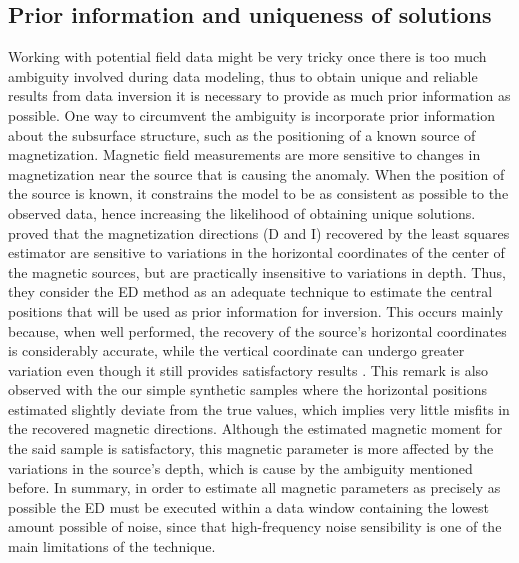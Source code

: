 \subsection{Prior information and uniqueness of solutions}
Working with potential field data might be very tricky once there is too much ambiguity involved during data modeling, thus to obtain unique and reliable results from data inversion it is necessary to provide as much prior information as possible. One way to circumvent the ambiguity is incorporate prior information about the subsurface structure, such as the positioning of a known source of magnetization. Magnetic field measurements are more sensitive to changes in magnetization near the source that is causing the anomaly. When the position of the source is known, it constrains the model to be as consistent as possible to the observed data, hence increasing the likelihood of obtaining unique solutions. \citet{Oliveira2015Estimation} proved that the magnetization directions (D and I) recovered by the least squares estimator are sensitive to variations in the horizontal coordinates of the center of the magnetic sources, but are practically insensitive to variations in depth. Thus, they consider the ED method as an adequate technique to estimate the central positions that will be used as prior information for inversion. This occurs mainly because, when well performed, the recovery of the source's horizontal coordinates is considerably accurate, while the vertical coordinate can undergo greater variation even though it still provides satisfactory results \citep{Silva20033D, Melo2013}. This remark is also observed with the our simple synthetic samples where the horizontal positions estimated slightly deviate from the true values, which implies very little misfits in the recovered magnetic directions. Although the estimated magnetic moment for the said sample is satisfactory, this magnetic parameter is more affected by the variations in the source's depth, which is cause by the ambiguity mentioned before. In summary, in order to estimate all magnetic parameters as precisely as possible the ED must be executed within a data window containing the lowest amount possible of noise, since that high-frequency noise sensibility is one of the main limitations of the technique.

